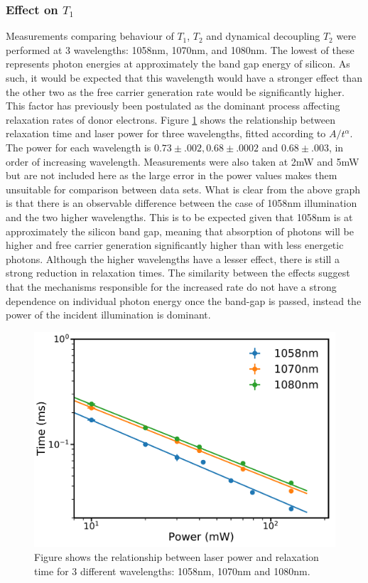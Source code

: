 \subsubsection{Effect on $T_1$}

Measurements comparing behaviour of $T_1$, $T_2$ and dynamical decoupling $T_2$ were performed at 3 wavelengths: 1058nm, 1070nm, and 1080nm.
The lowest of these represents photon energies at approximately the band gap energy of silicon. 
As such, it would be expected that this wavelength would have a stronger effect than the other two as the free carrier generation rate would be significantly higher.
This factor has previously been postulated as the dominant process affecting relaxation rates of donor electrons.
Figure \ref{fig:wavcomparison} shows the relationship between relaxation time and laser power for three wavelengths, fitted according to $A/t^{\alpha}$. 
The power for each wavelength is $0.73\pm.002, 0.68\pm.0002$ and $0.68\pm.003$, in order of increasing wavelength.
Measurements were also taken at 2mW and 5mW but are not included here as the large error in the power values makes them unsuitable for comparison between data sets. 
What is clear from the above graph is that there is an observable difference between the case of 1058nm illumination and the two higher wavelengths. 
This is to be expected given that 1058nm is at approximately the silicon band gap, meaning that absorption of photons will be higher and free carrier generation significantly higher than with less energetic photons.
Although the higher wavelengths have a lesser effect, there is still a strong reduction in relaxation times.
The similarity between the effects suggest that the mechanisms responsible for the increased rate do not have a strong dependence on individual photon energy once the band-gap is passed, instead the power of the incident illumination is dominant. 

\begin{figure}
\centering
\includegraphics[width = 0.8\columnwidth]{Figures/Logwavelengthcomp.pdf}
\caption[Relaxation comparison at 8k and 1058nm, 1070nm, and 1080nm illumination]{Figure shows the relationship between laser power and relaxation time for 3 different wavelengths: 1058nm, 1070nm and 1080nm.}
\label{fig:wavcomparison}
\end{figure}

